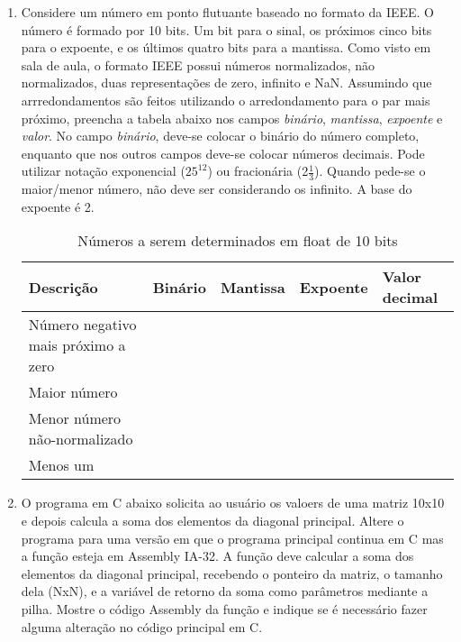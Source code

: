 \begin{enumerate}[resume]
    \item
    Considere um número em ponto flutuante baseado no formato da IEEE.
    O número é formado por 10 bits. 
    Um bit para o sinal, 
    os próximos cinco bits para o expoente,
    e os últimos quatro bits para a mantissa.
    Como visto em sala de aula, o formato IEEE possui números normalizados,
    não normalizados, duas representações de zero, infinito e NaN.
    Assumindo que arrredondamentos são feitos utilizando
    o arredondamento para o par mais próximo,
    preencha a tabela abaixo nos campos 
    \textit{binário}, \textit{mantissa}, \textit{expoente} e \textit{valor}.
    No campo \textit{binário}, deve-se colocar o binário do número completo,
    enquanto que nos outros campos deve-se colocar números decimais.
    Pode utilizar notação exponencial ($25^{12}$) ou fracionária (2$\frac{1}{3}$).
    Quando pede-se o maior/menor número, não deve ser considerando os  infinito.
    A base do expoente é 2.

    \begin{table}[H]
        \begin{tabular}{|l|l|l|l|l|}
            \hline
            \textbf{Descrição}  & 
            \textbf{Binário}    & 
            \textbf{Mantissa}   &
            \textbf{Expoente}   &
            \textbf{Valor decimal} \\\hline
            Número negativo mais próximo a zero & & & & \\\hline
            Maior número & & & & \\\hline
            Menor número não-normalizado & & & & \\\hline
            Menos um & & & & \\
            \hline
        \end{tabular}
        \label{tab:float 10 bits}
        \caption{Números a serem determinados em float de 10 bits}
    \end{table}

    \item
    O programa em C abaixo solicita ao usuário os valoers de uma matriz 10x10
    e depois calcula a soma dos elementos da diagonal principal.
    Altere o programa para uma versão em que o programa principal continua em C
    mas a função  esteja em Assembly IA-32.
    A função deve calcular a soma dos elementos da diagonal principal,
    recebendo o ponteiro da matriz, o tamanho dela (NxN),
    e a variável de retorno da soma como parâmetros mediante a pilha.
    Mostre o código Assembly da função 
    e indique se é necessário fazer alguma alteração no código principal em C. 


\end{enumerate}
